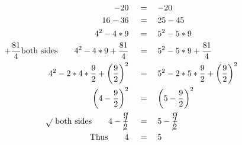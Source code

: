 \begin{align*}
-20\quad&\,=\quad-20\\
16-36\quad&\,=\quad25-45\\
4^2-4*9\quad&\,=\quad5^2-5*9\\
+\frac{81}{4}\mathrm{both~sides}\qquad4^2-4*9+\frac{81}{4}\quad&\,=\quad5^2-5*9+\frac{81}{4}\\
4^2-2*4*\frac{9}{2}+\left(\frac{9}{2}\right)^2\quad&\,=\quad5^2-2*5*\frac{9}{2}+\left(\frac{9}{2}\right)^2\\
\left(4-\frac{9}{2}\right)^2\quad&\,=\quad\left(5-\frac{9}{2}\right)^2\\
\sqrt{}~\mathrm{both~sides}\qquad4-\cancel{\frac{9}{2}}\quad&\,=\quad5-\cancel{\frac{9}{2}}\\
\mathrm{Thus}\qquad4\quad&\,=\quad5
\end{align*}
